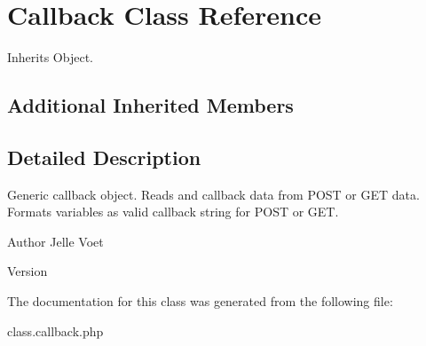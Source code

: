 \hypertarget{class_callback}{\section{Callback Class Reference}
\label{class_callback}
}


Inherits Object.

\subsection*{Additional Inherited Members}


\subsection{Detailed Description}
Generic callback object. Reads and callback data from P\-O\-S\-T or G\-E\-T data. Formats variables as valid callback string for P\-O\-S\-T or G\-E\-T.

\begin{DoxyAuthor}{Author}
Jelle Voet 
\end{DoxyAuthor}
\begin{DoxyVersion}{Version}

\end{DoxyVersion}


The documentation for this class was generated from the following file\-:\begin{DoxyCompactItemize}
\item 
class.\-callback.\-php\end{DoxyCompactItemize}
